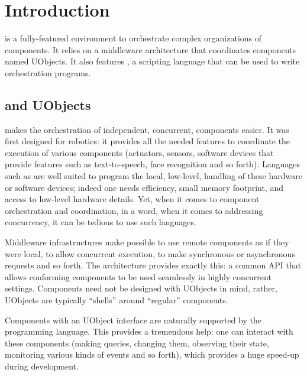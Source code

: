 
\chapter{Introduction}

\usdk is a fully-featured environment to orchestrate complex
organizations of components.  It relies on a middleware architecture
that coordinates components named UObjects.  It also features \us, a
scripting language that can be used to write orchestration programs.

\section{\urbi and UObjects}

\urbi makes the orchestration of independent, concurrent, components
easier.  It was first designed for robotics: it provides all the
needed features to coordinate the execution of various components
(actuators, sensors, software devices that provide features such as
text-to-speech, face recognition and so forth).  Languages such as
\Cxx are well suited to program the local, low-level, handling of
these hardware or software devices; indeed one needs efficiency, small
memory footprint, and access to low-level hardware details.  Yet, when
it comes to component orchestration and coordination, in a word, when
it comes to addressing concurrency, it can be tedious to use such
languages.

Middleware infrastructures make possible to use remote components as
if they were local, to allow concurrent execution, to make synchronous
or asynchronous requests and so forth.  The  \Cxx
architecture provides exactly this: a common API that allows
conforming components to be used seamlessly in highly concurrent
settings.  Components need not be designed with UObjects in mind,
rather, UObjects are typically ``shells'' around ``regular''
components.

Components with an UObject interface are naturally supported by the
\us programming language.  This provides a tremendous help: one can
interact with these components (making queries, changing them,
observing their state, monitoring various kinds of events and so
forth), which provides a huge speed-up during development.

